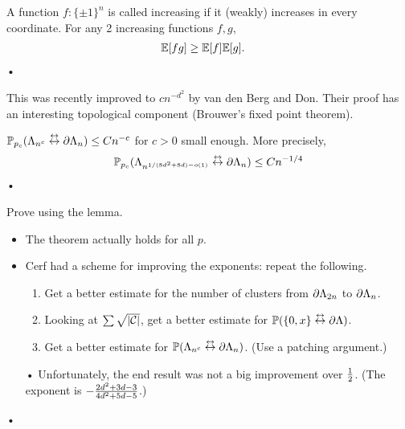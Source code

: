 \begin{thm}
A function $f:\{\pm1\}^n$ is called increasing if it (weakly) increases in every coordinate. For any 2 increasing functions $f,g$, 
\begin{align*}
\mathbb{E}[fg] &\ge \mathbb{E}[f]\mathbb{E}[g].
\end{align*}•
\end{thm}


This was recently improved to $cn^{-d^2}$ by van den Berg and Don.
Their proof has an interesting topological component (Brouwer's fixed point theorem).


\begin{thm}[Cerf, 2015]
$\mathbb{P}_{p_c}(\Lambda_{n^c} \stackrel {\leftrightarrow}{\leftrightarrow} \partial \Lambda_n) \le Cn^{-c}$ for $c>0$ small enough.
More precisely, 
\begin{align*}
\mathbb{P}_{p_c}(\Lambda_{n^{1/(8d^2+8d)-o(1)}} \stackrel {\leftrightarrow}{\leftrightarrow} \partial \Lambda_n) \le Cn^{-1/4}
\end{align*}•
\end{thm}
Prove using the lemma.
\begin{itemize}
\item
The theorem actually holds for all $p$.
\item
Cerf had a scheme for improving the exponents: repeat the following.
\begin{enumerate}
\item
Get a better estimate for the number of clusters from $\partial \Lambda_{2n}$ to $\partial \Lambda_n$.
\item
Looking at $\sum \sqrt{|\mathcal{C}|}$, get a better estimate for $\mathbb{P}(\{0,x\}\stackrel {\leftrightarrow}{\leftrightarrow} \partial \Lambda)$. 
\item
Get a better estimate for $\mathbb{P}(\Lambda_{n^c} \stackrel {\leftrightarrow}{\leftrightarrow} \partial \Lambda_n)$. (Use a patching argument.)
\end{enumerate}•
Unfortunately, the end result was not a big improvement over $\frac{1}{2}$.
(The exponent is $-\frac{2d^2+3d-3}{4d^2+5d-5}$.)
\end{itemize}•


